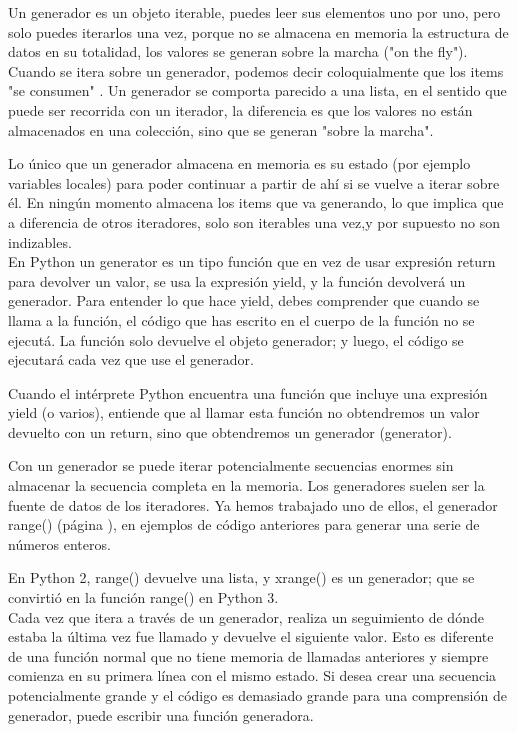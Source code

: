 Un generador es un objeto iterable, puedes leer sus elementos uno por uno, pero solo puedes iterarlos una vez, porque no se almacena en memoria la estructura de datos en su totalidad,  los valores se generan sobre la marcha ({}"{}on the fly{}"{}). Cuando se itera sobre un generador, podemos decir coloquialmente que los items "se consumen" .
Un generador se comporta parecido a una lista, en el sentido que puede ser recorrida con un iterador, la diferencia es que los valores no están almacenados en una colección, sino que se generan "sobre la marcha".

Lo único que un generador almacena en memoria es su estado (por ejemplo variables locales) para poder continuar a partir de ahí si se vuelve a iterar sobre él. En ningún momento almacena los items que va generando, lo que implica que a diferencia de otros iteradores, solo son iterables una vez,y por supuesto no son indizables.\\


En Python un generator es un tipo función que en vez de usar expresión {\ttfamily return} para devolver un valor, se usa la expresión {\ttfamily yield}, y la función devolverá un generador. Para entender lo que hace {\ttfamily yield}, debes comprender que cuando se llama a la función, el código que has escrito en el cuerpo de la función no se ejecutá. La función solo devuelve el objeto generador; y luego, el código se ejecutará cada vez que use el generador.

Cuando el intérprete Python encuentra una función que incluye una expresión  {\ttfamily yield} (o varios), entiende que al llamar esta función no obtendremos un valor devuelto con un {\ttfamily return}, sino que obtendremos un generador (generator).

Con un generador se puede iterar potencialmente secuencias enormes sin almacenar la secuencia completa en la memoria. Los generadores suelen ser la fuente de datos de los iteradores. Ya hemos trabajado uno de ellos, el generador {\ttfamily range()} (página \pageref{rango}), en ejemplos de código anteriores para generar una serie de números enteros.

En Python 2, {\ttfamily range()} devuelve una lista, y {\ttfamily xrange()} es un generador; que se convirtió en la función  {\ttfamily range()} en Python 3.\\ 


Cada vez que itera a través de un generador, realiza un seguimiento de dónde estaba la última vez
fue llamado y devuelve el siguiente valor. Esto es diferente de una función normal que no tiene memoria de llamadas anteriores y siempre comienza en su primera línea con el mismo estado.
Si desea crear una secuencia potencialmente grande y el código es demasiado grande para una 
comprensión de generador, puede escribir una función generadora.


